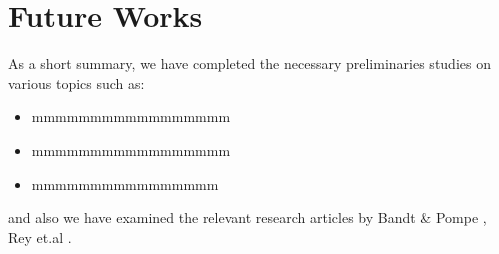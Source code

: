 \chapter{Future Works}\label{C:futw}

As a short summary, we have completed the necessary preliminaries studies on various topics such as:
\begin{itemize}
    \item mmmmmmmmmmmmmmmmm
    \item mmmmmmmmmmmmmmmmm
    \item mmmmmmmmmmmmmmmm
\end{itemize}

and also we have examined the relevant research articles by Bandt \& Pompe \cite{PhysRevLett.88.174102}, Rey et.al \cite{Rey2023a,Rey2023}.

